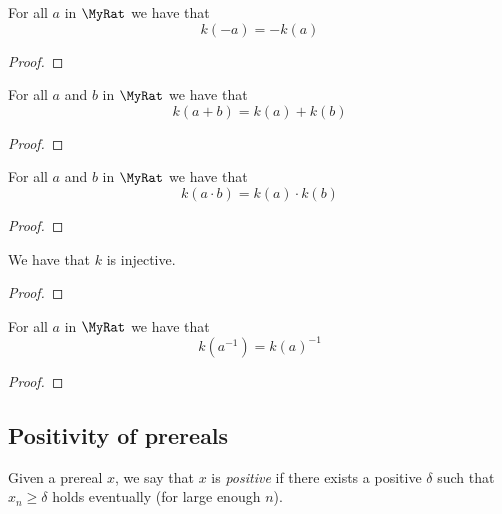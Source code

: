 \begin{lemma}
    \label{MyReal.k_neg}
    \leanok
For all $a$ in $\MyRat$ we have that
\[
k(-a) = -k(a)
\]
\end{lemma}
\begin{proof}
    \leanok
\end{proof}

\begin{lemma}
    \label{MyReal.k_add}
    \leanok
For all $a$ and $b$ in $\MyRat$ we have that
\[
k(a+b) = k(a) + k(b)
\]
\end{lemma}
\begin{proof}
    \leanok
\end{proof}

\begin{lemma}
    \label{MyReal.k_mul}
    \leanok
For all $a$ and $b$ in $\MyRat$ we have that
\[
k(a \cdot b) = k(a) \cdot k(b)
\]
\end{lemma}
\begin{proof}
    \leanok
\end{proof}

\begin{lemma}
    \label{MyReal.k_injective}
    \leanok
    We have that $k$ is injective.
\end{lemma}
\begin{proof}
    \leanok
\end{proof}

\begin{lemma}
    \label{MyReal.k_inv}
    \leanok
    For all $a$ in $\MyRat$ we have that
    \[
    k(a^{-1}) = k(a)^{-1}
    \]
\end{lemma}
\begin{proof}
    \leanok
\end{proof}

\subsection{Positivity of prereals}

\newcommand{\labell}[1]{
    \label{#1}
    \lean{#1}
}

\begin{definition}
    \labell{MyPrereal.IsPos}
    \leanok
    Given a prereal $x$, we say that $x$ is \emph{positive} if there exists a positive $\delta$ such that $x_n \geq \delta$ holds eventually (for large enough $n$).
\end{definition}

